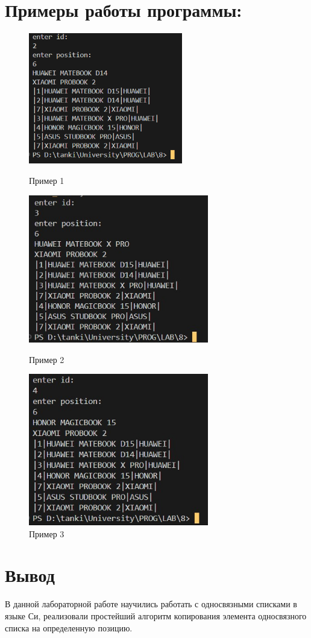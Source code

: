 \documentclass[a4paper,12pt]{report}
\begin{document}
\section*{Примеры работы программы:}
\begin{figure}[ph]
    \includegraphics[width=0.6\textwidth]{ex1.jpg}
\caption{Пример 1}
\label{ris:image1}
    \includegraphics[width=0.7\textwidth]{ex2.jpg}
\caption{Пример 2}
\label{ris:image2}
\includegraphics[width=0.7\textwidth]{ex3.jpg}
\caption{Пример 3}
\label{ris:image3}

\end{figure}


\newpage

\section*{Вывод}
В данной лабораторной работе научились работать с односвязными списками в языке Си, 
реализовали простейший алгоритм копирования элемента односвязного списка на определенную позицию.
\end{document}
